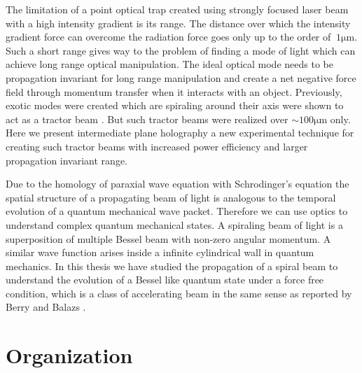 The limitation of a point optical trap created using strongly focused laser beam with a high intensity gradient is its range. The distance over which the intensity gradient force can overcome the radiation force goes only up to the order of $~1\mathrm{\mu m}$. Such a short range gives way to the problem of finding a mode of light which can achieve long range optical manipulation. The ideal optical mode  needs to be propagation invariant for long range manipulation and create a net negative force field through momentum transfer when it interacts with an object. Previously, exotic modes were created which are spiraling around their axis were shown to act as a tractor beam \cite{Lee_2010}. But such tractor beams were realized over $\sim 100 \mathrm{\mu m}$ only. Here we present intermediate plane holography a new experimental technique for creating such tractor beams with increased power efficiency and larger propagation invariant range.

Due to the homology of paraxial wave equation with Schrodinger's equation the spatial structure of a propagating beam of light is analogous to the temporal evolution of a quantum mechanical wave packet. Therefore we can use optics to understand complex quantum mechanical states. A spiraling beam of light is a superposition of multiple Bessel beam with non-zero angular momentum. A similar wave function arises inside a infinite cylindrical wall in quantum mechanics. In this thesis we have studied the propagation of a spiral beam to understand the evolution of a Bessel like quantum state under a force free condition, which is a class of accelerating beam in the same sense as reported by Berry and Balazs \cite{Berry1979}.





\section{Organization}

